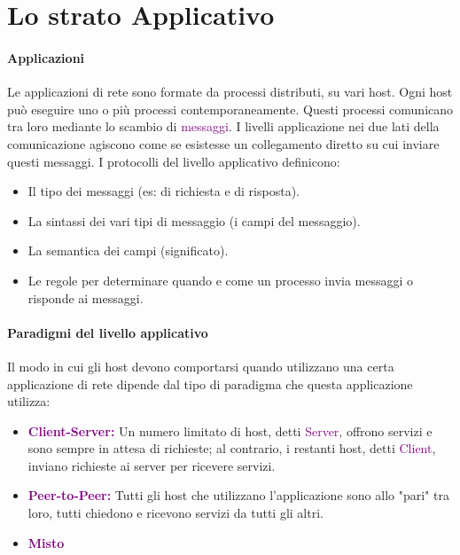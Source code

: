 \newpage
\section{Lo strato Applicativo}
\paragraph{Applicazioni} 
Le applicazioni di rete sono formate da processi distributi, su vari host. Ogni host può eseguire uno o più processi contemporaneamente. Questi processi comunicano tra loro mediante lo scambio di \textcolor{purple}{messaggi}.
\newline I livelli applicazione nei due lati della comunicazione agiscono come se esistesse un collegamento diretto su cui inviare questi messaggi.
\newline I protocolli del livello applicativo definicono:
\begin{itemize}
    \item Il tipo dei messaggi (es: di richiesta e di risposta).
    \item La sintassi dei vari tipi di messaggio (i campi del messaggio).
    \item La semantica dei campi (significato).
    \item Le regole per determinare quando e come un processo invia messaggi o risponde ai messaggi.
\end{itemize}

\paragraph{Paradigmi del livello applicativo} Il modo in cui gli host devono comportarsi quando utilizzano una certa applicazione di rete dipende dal tipo di paradigma che questa applicazione utilizza:
\begin{itemize}
    \item \textbf{\textcolor{purple}{Client-Server:}} Un numero limitato di host, detti \textcolor{purple}{Server}, offrono servizi e sono sempre in attesa di richieste; al contrario, i restanti host, detti \textcolor{purple}{Client}, inviano richieste ai server per ricevere servizi.
    \item \textbf{\textcolor{purple}{Peer-to-Peer:}} Tutti gli host che utilizzano l'applicazione sono allo "pari" tra loro, tutti chiedono e ricevono servizi da tutti gli altri.
    \item \textbf{\textcolor{purple}{Misto}}
\end{itemize}

